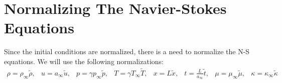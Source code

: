 \documentclass[11pt, a4paper]{article}
\begin{document}
\section{Normalizing The Navier-Stokes Equations}
Since the initial conditions are normalized, there is a need to normalize the N-S equations. We will use the following normalizations:
\begin{equation}
    \begin{matrix}
        \rho=\rho_\infty\tilde{\rho}, & u=a_\infty\tilde{u}, & p=\gamma p_\infty\tilde{p}, & T=\gamma T_\infty\tilde{T}, & x=L\tilde{x}, & \displaystyle t=\frac{L}{a_\infty}\tilde{t}, & \mu=\mu_\infty\tilde{\mu}, & \kappa=\kappa_\infty\tilde{\kappa}
    \end{matrix}
\end{equation}
\end{document}
